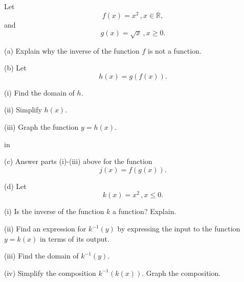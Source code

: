 \documentclass{ximera}
\newcommand{\pskip}{\vskip 0.1 in}
\begin{document}
\begin{question}    \label{Q1:Quadratics}
Let 
\[
    f(x) = x^2 \, , x \in \mathbb{R} ,
\]
and 
\[
     g(x) = \sqrt{x} \, , x\geq 0 .
\]

(a) Explain why the inverse of the function $f$ is not a function.

(b) Let 
\[
    h(x) = g(f(x)) .
\]

(i) Find the domain of $h$.

(ii) Simplify $h(x)$.

(iii) Graph the function $y=h(x)$.

\pskip

(c) Answer parts (i)-(iii) above for the function
\[
   j(x) = f(g(x)) .
\]

(d) Let
\[
   k(x) = x^2 \, , x\leq 0 .
\]

(i) Is the inverse of the function $k$ a function? Explain.

(ii) Find an expression for $k^{-1}(y)$ by expressing the input to the function $y=k(x)$ in terms of its output.

(iii) Find the domain of $k^{-1}(y)$.

(iv) Simplify the composition $k^{-1}(k(x))$. Graph the composition.

\end{question}
\end{document}
